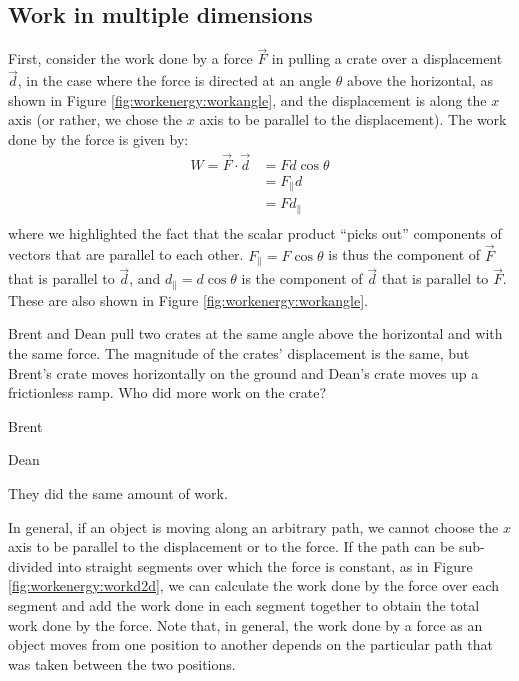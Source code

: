 \subsection{Work in multiple dimensions}
First, consider the work done by a force $\vec F$ in pulling a crate over a displacement $\vec d$, in the case where the force is directed at an angle $\theta$ above the horizontal, as shown in Figure \ref{fig:workenergy:workangle}, and the displacement is along the $x$ axis (or rather, we chose the $x$ axis to be parallel to the displacement).
The work done by the force is given by:
\begin{align*}
W = \vec F \cdot \vec d &= Fd\cos\theta\\
&= F_{\parallel}d\\
&= Fd_{\parallel}\\
\end{align*}
where we highlighted the fact that the scalar product ``picks out'' components of vectors that are parallel to each other. $F_{\parallel} = F\cos\theta$ is thus the component of $\vec F$ that is parallel to $\vec d$, and $d_{\parallel}=d\cos\theta$ is the component of $\vec d$ that is parallel to $\vec F$. These are also shown in Figure \ref{fig:workenergy:workangle}.

\begin{checkpoint}
\begin{MCquestion}{
Brent and Dean pull two crates at the same angle above the horizontal and with the same force. The magnitude of the crates' displacement is the same, but Brent's crate moves horizontally on the ground and Dean's crate moves up a frictionless ramp. Who did more work on the crate?}
\item Brent
\item Dean %
\item They did the same amount of work.
\end{MCquestion}
\end{checkpoint}

In general, if an object is moving along an arbitrary path, we cannot choose the $x$ axis to be parallel to the displacement or to the force. If the path can be sub-divided into straight segments over which the force is constant, as in Figure \ref{fig:workenergy:workd2d}, we can calculate the work done by the force over each segment and add the work done in each segment together to obtain the total work done by the force. Note that, in general, the work done by a force as an object moves from one position to another depends on the particular path that was taken between the two positions.

